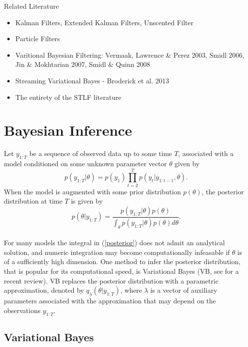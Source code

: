 \documentclass[12pt,a4paper]{article}\usepackage[]{graphicx}\usepackage[]{color}
\begin{document}
Related Literature
\begin{itemize}
\item Kalman Filters, Extended Kalman Filters, Unscented Filter
\item Particle Filters
\item Varitional Bayesian Filtering: Vermaak, Lawrence \& Perez 2003, Smidl 2006, Jin \& Mokhtarian 2007, Smidl \& Quinn 2008
\item Streaming Variational Bayes - Broderick et al. 2013
\item The entirety of the STLF literature
\end{itemize}

\section{Bayesian Inference}
\label{sec:Inference}

Let $y_{1:T}$ be a sequence of observed data up to some time $T$, associated with a model conditioned on some unknown parameter vector $\theta$ given by
\begin{equation}
\label{likelihood}
p(y_{1:T} | \theta) = p(y_1) \prod_{t=2}^{T} p(y_t | y_{1:t-1}, \theta).
\end{equation}
When the model is augmented with some prior distribution $p(\theta)$, the posterior distribution at time $T$ is given by
\begin{equation}
\label{posterior}
p(\theta | y_{1:T}) = \frac{p(y_{1:T} | \theta)p(\theta)}{\int_{\theta}p(y_{1:T} | \theta)p(\theta)d\theta}.
\end{equation}
\\

For many models the integral in (\ref{posterior}) does not admit an analytical solution, and numeric integration may become computationally infeasable if $\theta$ is of a sufficiently high dimension. One method to infer the posterior distribution, that is popular for its computational speed, is Variational Bayes (VB, see \citet{Blei2017} for a recent review). VB replaces the posterior distribution with a parametric approximation, denoted by $q_{\lambda}(\theta |y_{1:T})$, where $\lambda$ is a vector of auxiliary parameters associated with the approximation that may depend on the observations $y_{1:T}$.

\subsection{Variational Bayes}
\label{subsec:VB}
\end{document}

